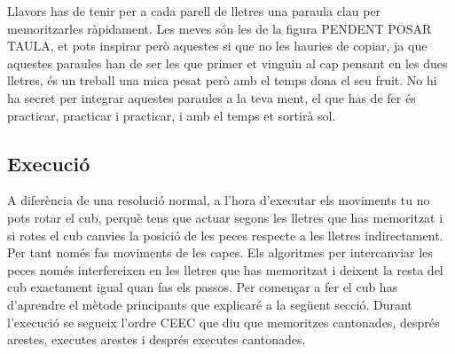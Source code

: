 Llavors has de tenir per a cada parell de lletres una paraula clau per memoritzarles ràpidament. Les meves són les de la figura PENDENT POSAR TAULA, et pots inspirar però aquestes si que no les hauries de copiar, ja que aquestes paraules han de ser les que primer et vinguin al cap pensant en les dues lletres, és un treball una mica pesat però amb el temps dona el seu fruit.
No hi ha secret per integrar aquestes paraules a la teva ment, el que has de fer és practicar, practicar i practicar, i amb el temps et sortirà sol.




\subsection{Execució}

A diferència de una resolució normal, a l'hora d'executar els moviments tu no pots rotar el cub, perquè tens que actuar segons les lletres que has memoritzat i si rotes el cub canvies la posició de les peces respecte a les lletres indirectament. 
Per tant només fas moviments de les capes. Els algoritmes per intercanviar les peces només interfereixen en les lletres que has memoritzat i deixent la resta del cub exactament igual quan fas els passos. Per començar a fer el cub has d'aprendre el mètode principants que explicaré a la següent secció.
Durant l'execució se segueix l'ordre CEEC que diu que memoritzes cantonades, després arestes, executes arestes i després executes cantonades.
